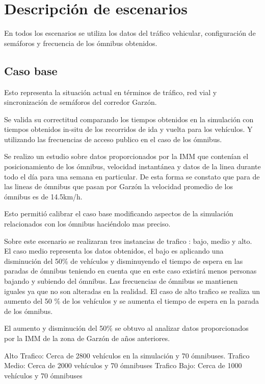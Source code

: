 \section{Descripción de escenarios}
En todos los escenarios se utiliza los datos del tráfico vehicular, configuración de semáforos y frecuencia de los ómnibus obtenidos. 

\subsection{Caso base}
Esto representa la situación actual en términos de tráfico, red vial y sincronización de semáforos del corredor Garzón. 

Se valida su correctitud comparando los tiempos obtenidos en la simulación con tiempos obtenidos in-situ de los recorridos de ida y vuelta para los vehículos. Y utilizando las frecuencias de acceso publico en el caso de los ómnibus.

Se realizo un estudio sobre datos proporcionados por la IMM que contenían el posicionamiento de los ómnibus, velocidad instantánea y datos de la linea durante todo el día para una semana en particular. De esta forma se constato que para de las lineas de ómnibus que pasan por Garzón la  velocidad promedio de los ómnibus es de 14.5km/h.

Esto permitió calibrar el caso base modificando aspectos de la simulación relacionados con los ómnibus haciéndolo mas preciso.

Sobre este escenario se realizaran tres instancias de trafico : bajo, medio y alto.
El caso medio representa los datos obtenidos, el bajo es aplicando una disminución del 50\% de vehículos y disminuyendo el tiempo de espera en las paradas de ómnibus teniendo en cuenta que en este caso existirá menos personas bajando y subiendo del ómnibus. Las frecuencias de ómnibus se mantienen iguales ya que no son alteradas en la realidad.
El caso de alto trafico se realiza un aumento del 50 \% de los vehículos y se aumenta el tiempo de espera en la parada de los ómnibus.

El aumento y disminución del 50\% se obtuvo al analizar datos proporcionados por la IMM de la zona de Garzón de años anteriores. \newline

Alto Trafico: Cerca de 2800 vehículos en la simulación y 70 ómnibuses. \newline
Trafico Medio: Cerca de 2000 vehículos y 70 ómnibuses \newline
Trafico Bajo: Cerca de 1000 vehículos y 70 ómnibuses
 

